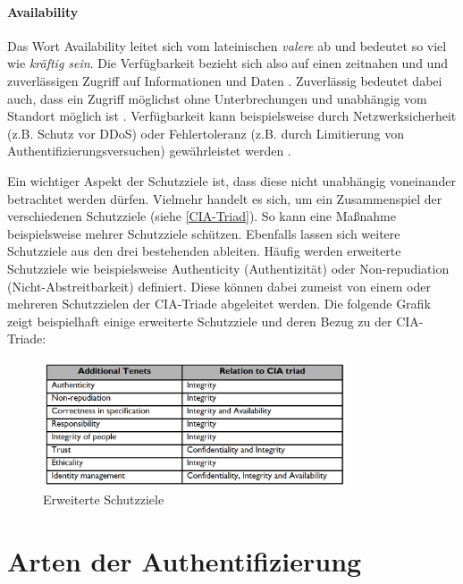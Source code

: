 \paragraph*{Availability}
Das Wort Availability leitet sich vom lateinischen \textit{valere} ab und bedeutet so viel wie \textit{kräftig sein}. Die Verfügbarkeit bezieht sich also auf einen zeitnahen und und zuverlässigen Zugriff auf Informationen und Daten \cite{samonas2014cia}. Zuverlässig bedeutet dabei auch, dass ein Zugriff möglichst ohne Unterbrechungen und unabhängig vom Standort möglich ist \cite{agarwal2011security}.
Verfügbarkeit kann beispielsweise durch Netzwerksicherheit (z.B. Schutz vor \ac{DDoS}) oder Fehlertoleranz (z.B. durch Limitierung von Authentifizierungsversuchen) gewährleistet werden \cite{agarwal2011security}.

Ein wichtiger Aspekt der Schutzziele ist, dass diese nicht unabhängig voneinander betrachtet werden dürfen. Vielmehr handelt es sich, um ein Zusammenspiel der verschiedenen Schutzziele (siehe \ref*{CIA-Triad}). So kann eine Maßnahme beispielsweise mehrer Schutzziele schützen. Ebenfalls lassen sich weitere Schutzziele aus den drei bestehenden ableiten. Häufig werden erweiterte Schutzziele wie beispielsweise Authenticity (Authentizität) oder Non-repudiation (Nicht-Abstreitbarkeit) \cite{samonas2014cia} definiert. Diese können dabei zumeist von einem oder mehreren Schutzzielen der CIA-Triade abgeleitet werden. Die folgende Grafik zeigt beispielhaft einige erweiterte Schutzziele und deren Bezug zu der CIA-Triade:

\begin{figure}[h]
	\centering 
	\includegraphics[width=0.8\textwidth]{img/abbildungen/Schutzziele.png}
	\captionsetup{format=hang}
	\caption{Erweiterte Schutzziele} \label{Schutzziele}
\end{figure}


\section{Arten der Authentifizierung}

